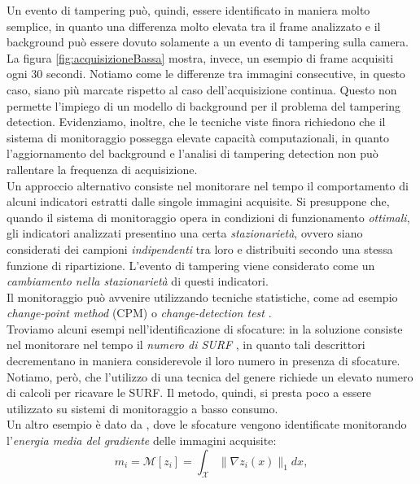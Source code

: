 Un evento di tampering pu\`o, quindi, essere identificato in maniera molto semplice, in quanto una differenza molto elevata tra il frame analizzato e il background pu\`o essere dovuto solamente a un evento di tampering sulla camera.
La figura \ref{fig:acquisizioneBassa} mostra, invece, un esempio di frame acquisiti ogni 30 secondi.
Notiamo come le differenze tra immagini consecutive, in questo caso, siano pi\`u marcate rispetto al caso dell'acquisizione continua. 
Questo non permette l'impiego di un modello di background per il problema del tampering detection.
Evidenziamo, inoltre, che le tecniche viste finora richiedono che il sistema di monitoraggio possegga elevate capacit\`a computazionali, in quanto l'aggiornamento del background e l'analisi di tampering detection non pu\`o rallentare la frequenza di acquisizione.\\
Un approccio alternativo consiste nel monitorare nel tempo il comportamento di alcuni indicatori estratti dalle singole immagini acquisite.
Si presuppone che, quando il sistema di monitoraggio opera in condizioni di funzionamento \textit{ottimali}, gli indicatori analizzati presentino una certa \textit{stazionariet\`a}, ovvero siano considerati dei campioni \textit{indipendenti} tra loro e distribuiti secondo una stessa funzione di ripartizione.
L'evento di tampering viene considerato come un \textit{cambiamento nella stazionariet\`a} di questi indicatori.\\
Il monitoraggio pu\`o avvenire utilizzando tecniche statistiche, come ad esempio \textit{change-point method} (CPM) \cite{ross2011nonparametric} o \textit{change-detection test} \cite{pimentel2014review}.\\
Troviamo alcuni esempi nell'identificazione di sfocature: in \cite{tsesmelis2013tamper} la soluzione consiste nel monitorare nel tempo il \textit{numero di SURF} \cite{bay2006surf}, in quanto tali descrittori decrementano in maniera considerevole il loro numero in presenza di sfocature.
Notiamo, per\`o, che l'utilizzo di una tecnica del genere richiede un elevato numero di calcoli per ricavare le SURF.
Il metodo, quindi, si presta poco a essere utilizzato su sistemi di monitoraggio a basso consumo.\\
Un altro esempio \`e dato da \cite{alippi2010detecting}, dove le sfocature vengono identificate monitorando l'\textit{energia media del gradiente} delle immagini acquisite:
\[m_i = \mathcal{M}[z_i] = \int_{\mathcal{X}}\| \nabla z_i(x) \| _1 dx,\]
